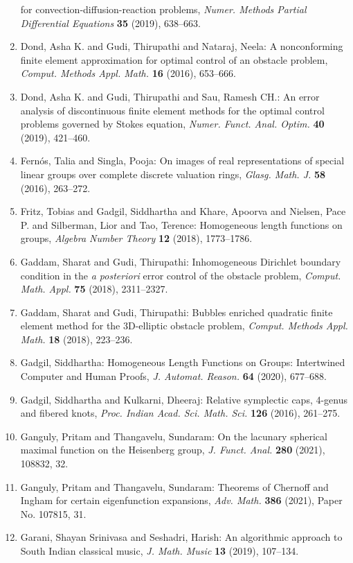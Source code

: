 \begin{enumerate}
for convection-diffusion-reaction problems, \emph{Numer. Methods Partial Differential Equations} {\bf 35} (2019), 638--663.
\item Dond, Asha K. and Gudi, Thirupathi and Nataraj, Neela: A nonconforming finite element approximation for optimal
control of an obstacle problem, \emph{Comput. Methods Appl. Math.} {\bf 16} (2016), 653--666.
\item Dond, Asha K. and Gudi, Thirupathi and Sau, Ramesh CH.: An error analysis of discontinuous finite element methods for
the optimal control problems governed by {S}tokes equation, \emph{Numer. Funct. Anal. Optim.} {\bf 40} (2019), 421--460.
\item Fern\'{o}s, Talia and Singla, Pooja: On images of real representations of special linear groups
over complete discrete valuation rings, \emph{Glasg. Math. J.} {\bf 58} (2016), 263--272.
\item Fritz, Tobias and Gadgil, Siddhartha and Khare, Apoorva and Nielsen, Pace P. and Silberman, Lior and Tao, Terence: Homogeneous length functions on groups, \emph{Algebra Number Theory} {\bf 12} (2018), 1773--1786.
\item Gaddam, Sharat and Gudi, Thirupathi: Inhomogeneous {D}irichlet boundary condition in the {\it a
posteriori} error control of the obstacle problem, \emph{Comput. Math. Appl.} {\bf 75} (2018), 2311--2327.
\item Gaddam, Sharat and Gudi, Thirupathi: Bubbles enriched quadratic finite element method for the
3{D}-elliptic obstacle problem, \emph{Comput. Methods Appl. Math.} {\bf 18} (2018), 223--236.
\item Gadgil, Siddhartha: Homogeneous {L}ength {F}unctions on {G}roups: {I}ntertwined
{C}omputer and {H}uman {P}roofs, \emph{J. Automat. Reason.} {\bf 64} (2020), 677--688.
\item Gadgil, Siddhartha and Kulkarni, Dheeraj: Relative symplectic caps, 4-genus and fibered knots, \emph{Proc. Indian Acad. Sci. Math. Sci.} {\bf 126} (2016), 261--275.
\item Ganguly, Pritam and Thangavelu, Sundaram: On the lacunary spherical maximal function on the {H}eisenberg
group, \emph{J. Funct. Anal.} {\bf 280} (2021), 108832, 32.
\item Ganguly, Pritam and Thangavelu, Sundaram: Theorems of {C}hernoff and {I}ngham for certain eigenfunction
expansions, \emph{Adv. Math.} {\bf 386} (2021), Paper No. 107815, 31.
\item Garani, Shayan Srinivasa and Seshadri, Harish: An algorithmic approach to {S}outh {I}ndian classical music, \emph{J. Math. Music} {\bf 13} (2019), 107--134.

\end{enumerate}
